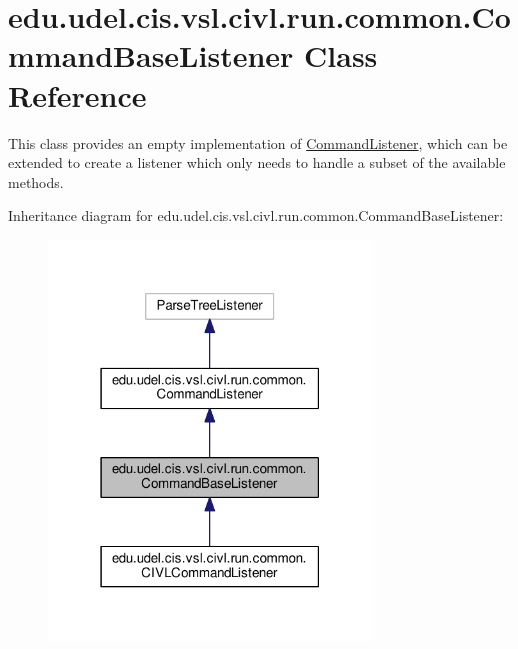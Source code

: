 \hypertarget{classedu_1_1udel_1_1cis_1_1vsl_1_1civl_1_1run_1_1common_1_1CommandBaseListener}{}\section{edu.\+udel.\+cis.\+vsl.\+civl.\+run.\+common.\+Command\+Base\+Listener Class Reference}
\label{classedu_1_1udel_1_1cis_1_1vsl_1_1civl_1_1run_1_1common_1_1CommandBaseListener}


This class provides an empty implementation of \hyperlink{interfaceedu_1_1udel_1_1cis_1_1vsl_1_1civl_1_1run_1_1common_1_1CommandListener}{Command\+Listener}, which can be extended to create a listener which only needs to handle a subset of the available methods.  




Inheritance diagram for edu.\+udel.\+cis.\+vsl.\+civl.\+run.\+common.\+Command\+Base\+Listener\+:
\nopagebreak
\begin{figure}[H]
\begin{center}
\leavevmode
\includegraphics[width=243pt]{classedu_1_1udel_1_1cis_1_1vsl_1_1civl_1_1run_1_1common_1_1CommandBaseListener__inherit__graph}
\end{center}
\end{figure}


